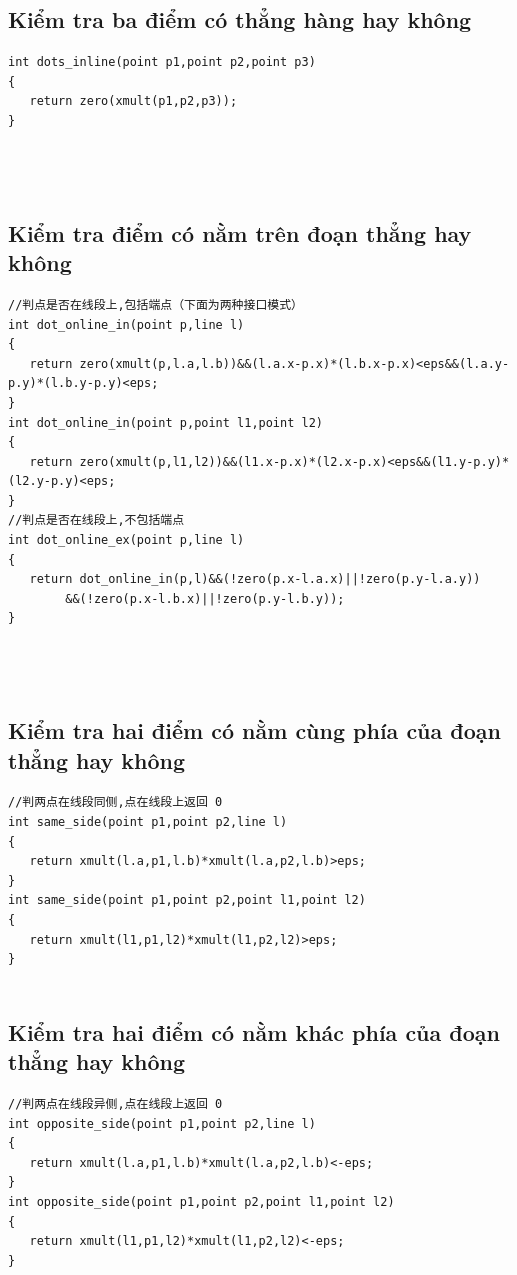 \documentclass[11pt]{article}
\begin{document}
\subsection{Kiểm tra ba điểm có thẳng hàng hay không}
\begingroup
\scriptsize
\begin{verbatim}
int dots_inline(point p1,point p2,point p3)
{
   return zero(xmult(p1,p2,p3));
}




\end{verbatim}
\endgroup
\subsection{Kiểm tra điểm có nằm trên đoạn thẳng hay không}
\begingroup
\scriptsize
\begin{verbatim}
//判点是否在线段上,包括端点（下面为两种接口模式）
int dot_online_in(point p,line l)
{
   return zero(xmult(p,l.a,l.b))&&(l.a.x-p.x)*(l.b.x-p.x)<eps&&(l.a.y-p.y)*(l.b.y-p.y)<eps;
}
int dot_online_in(point p,point l1,point l2)
{
   return zero(xmult(p,l1,l2))&&(l1.x-p.x)*(l2.x-p.x)<eps&&(l1.y-p.y)*(l2.y-p.y)<eps;
}
//判点是否在线段上,不包括端点
int dot_online_ex(point p,line l)
{
   return dot_online_in(p,l)&&(!zero(p.x-l.a.x)||!zero(p.y-l.a.y))
        &&(!zero(p.x-l.b.x)||!zero(p.y-l.b.y));
}




\end{verbatim}
\endgroup
\subsection{Kiểm tra hai điểm có nằm cùng phía của đoạn thẳng hay không}
\begingroup
\scriptsize
\begin{verbatim}
//判两点在线段同侧,点在线段上返回 0
int same_side(point p1,point p2,line l)
{
   return xmult(l.a,p1,l.b)*xmult(l.a,p2,l.b)>eps;
}
int same_side(point p1,point p2,point l1,point l2)
{
   return xmult(l1,p1,l2)*xmult(l1,p2,l2)>eps;
}


\end{verbatim}
\endgroup
\subsection{Kiểm tra hai điểm có nằm khác phía của đoạn thẳng hay không}
\begingroup
\scriptsize
\begin{verbatim}
//判两点在线段异侧,点在线段上返回 0
int opposite_side(point p1,point p2,line l)
{
   return xmult(l.a,p1,l.b)*xmult(l.a,p2,l.b)<-eps;
}
int opposite_side(point p1,point p2,point l1,point l2)
{
   return xmult(l1,p1,l2)*xmult(l1,p2,l2)<-eps;
}


\end{verbatim}
\endgroup
\end{document}
